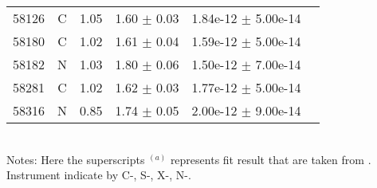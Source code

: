 \begin{table}
\begin{tabular}{lccccc}
58126 & C & 1.05 & 1.60  $\pm$  0.03 & 1.84e-12  $\pm$  5.00e-14 &  \\ 
58180 & C & 1.02 & 1.61  $\pm$  0.04 & 1.59e-12  $\pm$  5.00e-14 &  \\ 
58182 & N & 1.03 & 1.80  $\pm$  0.06 & 1.50e-12  $\pm$  7.00e-14 &  \\ 
58281 & C & 1.02 & 1.62  $\pm$  0.03 & 1.77e-12  $\pm$  5.00e-14 &  \\ 
58316 & N & 0.85 & 1.74  $\pm$  0.05 & 2.00e-12  $\pm$  9.00e-14 &  \\  \hline
\end{tabular}\\
Notes: Here the superscripts $^{(a)}$ represents fit result that are taken from \citet{2017A&A...607L...9K}. Instrument indicate by C-\chandra, S-\swift, X-\xmm, N-\nustar. 
\end{table}